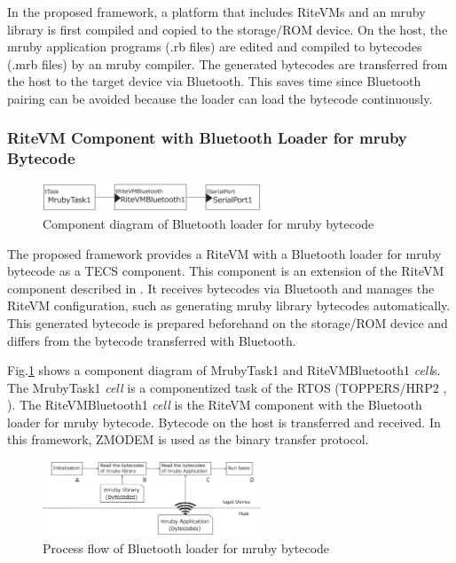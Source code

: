 \documentclass[S,R,E]{article/compsoft}
\begin{document}
In the proposed framework, a platform that includes RiteVMs and an mruby library is first compiled and copied to the storage/ROM device.
On the host, the mruby application programs (.rb files) are edited and compiled to bytecodes (.mrb files) by an mruby compiler.
The generated bytecodes are transferred from the host to the target device via Bluetooth.
This saves time since Bluetooth pairing can be avoided because the loader can load the bytecode continuously.

\subsubsection{RiteVM Component with Bluetooth Loader for mruby Bytecode}
\begin{figure}[t]
    \centering
    \includegraphics[width=6.5cm,clip]{figure/component_bluetooth.eps}
\caption{Component diagram of Bluetooth loader for mruby bytecode}
\label{fig:component_bluetooth}
\end{figure}
The proposed framework provides a RiteVM with a Bluetooth loader for mruby bytecode as a TECS component.
This component is an extension of the RiteVM component described in \cite{par:mrubyonTECS}.
It receives bytecodes via Bluetooth and manages the RiteVM configuration, such as generating mruby library bytecodes automatically.
This generated bytecode is prepared beforehand on the storage/ROM device and differs from the bytecode transferred with Bluetooth.

Fig.\ref{fig:component_bluetooth} shows a component diagram of MrubyTask1 and RiteVMBluetooth1 {\it cell}s.
The MrubyTask1 {\it cell} is a componentized task of the RTOS (TOPPERS/HRP2 \cite{url:HRP2}, \cite{par:hr-tecs}).
The RiteVMBluetooth1 {\it cell} is the RiteVM component with the Bluetooth loader for mruby bytecode.
Bytecode on the host is transferred and received.
In this framework, ZMODEM \cite{par:zmodem} is used as the binary transfer protocol.

\begin{figure}[t]
    \centering
    \includegraphics[width=6.5cm,clip]{figure/control_flow.eps}
\caption{Process flow of Bluetooth loader for mruby bytecode}
\label{fig:control_flow}
\end{figure}
\end{document}
